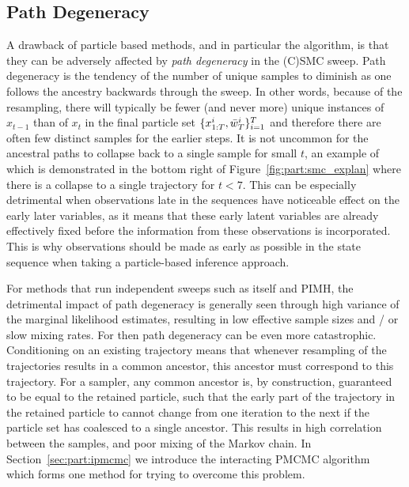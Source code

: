 \subsection{Path Degeneracy}
\label{sec:part:pmcmc:path-deg}

A drawback of particle based methods, and in particular the \pg algorithm, is that they can be adversely 
affected by \emph{path degeneracy} in the (C)SMC sweep.  Path degeneracy is the tendency of the number
of unique samples to diminish as one follows the ancestry backwards through the sweep.  In other words, because
of the resampling, there will typically be fewer (and never more) unique instances of $x_{t-1}$ than of $x_t$
in the final particle set $\{x_{1:T}^i,\bar w_{T}^i\}_{i=1}^T$ and therefore there are often few distinct samples
for the earlier steps.  It is not uncommon for the ancestral paths to collapse back to a single sample for
small $t$, an example of which is demonstrated in the bottom right of Figure~\ref{fig:part:smc_explan}
where there is a collapse to a single trajectory for $t<7$.
This can be especially detrimental when observations late in the sequences have noticeable
effect on the early later variables, as it means that these early latent variables are already effectively
fixed before the information from these observations is incorporated.   This is why observations should
be made as early as possible in the state sequence when taking a particle-based inference approach.

For methods that run independent \smc sweeps such as \smc itself and PIMH, the detrimental impact
of path degeneracy is generally seen through high variance of the marginal likelihood estimates,  resulting
in  low effective sample sizes and / or slow mixing rates.  For \pg then path degeneracy can be even
more catastrophic.  Conditioning on an existing trajectory means 
that whenever resampling of the trajectories results in a common ancestor, this ancestor must correspond 
to this trajectory.  For a \pg sampler, any common ancestor is, by construction, guaranteed to be equal 
to the retained particle, such that the early part of the trajectory in the retained particle to cannot
change from one iteration to the next if the particle set has coalesced to a single ancestor.
This results in high correlation between the samples, and poor mixing of the Markov chain.
In Section~\ref{sec:part:ipmcmc} we introduce the interacting PMCMC algorithm~\citep{rainforth2016interacting}
which forms one method for trying to overcome this problem.


